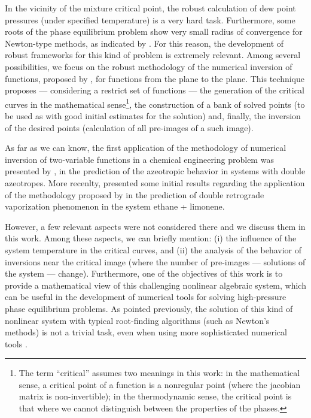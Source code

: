 \documentclass[journal=iecred,manuscript=article]{achemso}
\theoremstyle{definition}
\theoremstyle{remark}
\begin{document}
In the vicinity of the mixture critical point, the robust calculation of dew point pressures (under specified temperature) is a very hard task. Furthermore, some roots of the phase equilibrium problem show very small radius of convergence for Newton-type methods, as indicated by \citet{jnsa}. For this reason, the development of robust frameworks for this kind of problem is extremely relevant. Among several possibilities, we focus on the robust methodology of the numerical inversion of functions, proposed by \citet{malta}, for functions from
the plane to the plane. This technique \citep{malta} proposes --- considering a restrict set of functions --- the generation of the critical curves in the mathematical 
sense\footnote{The term \enquote{critical}  assumes two meanings in this work: in the mathematical sense, a critical point of a function
 is a nonregular point (where the jacobian matrix is non-invertible); in the thermodynamic sense, the critical point is that where we cannot distinguish between the properties of the phases.}, the construction of a bank of solved points (to be used as 
 with good initial estimates for the solution) and, finally, the inversion of the desired points (calculation of all pre-images of a such image).
 
As far as we can know, the first application of the methodology  of numerical inversion of two-variable functions in a chemical engineering problem was presented by \citet{canadian}, in the prediction of the azeotropic behavior in systems with double azeotropes. More recenlty, \citet{ireme} presented some initial results regarding the application of the methodology proposed by \citet{malta} in the prediction of double retrograde vaporization phenomenon in the system ethane + limonene. 

However, a few relevant aspects were not considered there and we discuss them in this work. Among these aspects, we can briefly mention: (i) the influence of the system temperature in the critical curves, and (ii) the analysis of the behavior of inversions near the critical image (where the number of pre-images --- solutions of the system --- change). Furthermore, one of the objectives of this work is to provide a mathematical view of this challenging nonlinear algebraic system, which can be useful in the development of numerical tools for solving high-pressure phase equilibrium problems. As pointed previously, the solution of this kind of nonlinear system with typical root-finding algorithms (such as Newton's methods) is not a trivial task, even when using more sophisticated numerical tools \cite{jnsa}.
\end{document}
